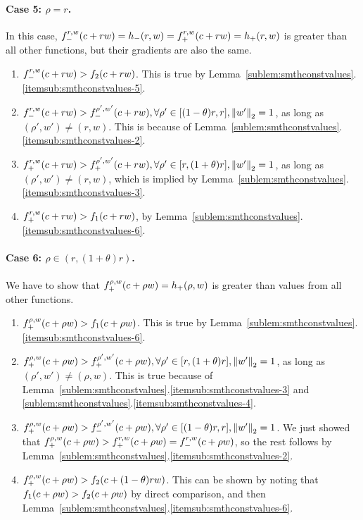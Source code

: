 \paragraph{Case 5: $\rho = r$.}
In this case, $f_-^{{r},{w}}(c+r w) = h_-(r, w) = f_+^{{r},{w}}(c+r w) = h_+(r, w)$ is greater than all other functions, but their gradients are also the same.
\begin{enumerate}
	\item $f_-^{{r},{w}}(c+r w) > f_{2}(c+r w)$.
	This is true by Lemma~\ref{sublem:smthconstvalues}.\ref{itemsub:smthconstvalues-5}.
	\item $f_-^{{r},{w}}(c+r w) > f_-^{{\rho'},{w'}}(c+r w),
	\forall \rho' \in [(1-\theta)r,r], \left\|{w'}\right\|_2 = 1$, as long as $(\rho', w') \neq (r, w)$.
	This is because of Lemma~\ref{sublem:smthconstvalues}.\ref{itemsub:smthconstvalues-2}. 
	\item $f_+^{{r},{w}}(c+r w) > f_+^{{\rho'},{w'}}(c+r w), 
	\forall \rho' \in [r,(1+\theta)r], \left\|{w'}\right\|_2 = 1$, as long as $(\rho', w') \neq (r, w)$,
	which is implied by Lemma~\ref{sublem:smthconstvalues}.\ref{itemsub:smthconstvalues-3}.
	\item $f_+^{{r},{w}}(c+r w) > f_{1}(c+r w)$, by Lemma~\ref{sublem:smthconstvalues}.\ref{itemsub:smthconstvalues-6}.
\end{enumerate}

\paragraph{Case 6: $\rho \in (r, (1+\theta)r)$.}
We have to show that $f_+^{{\rho},{w}}(c+\rho w) = h_+(\rho, w)$ is greater than values from all other functions.
\begin{enumerate}
	\item $f_+^{{\rho},{w}}(c+\rho w) > f_{1}(c+\rho w)$.
	This is true by Lemma~\ref{sublem:smthconstvalues}.\ref{itemsub:smthconstvalues-6}.
	\item $f_+^{{\rho},{w}}(c+\rho w) > f_+^{{\rho'},{w'}}(c+\rho w),
	\forall \rho' \in [r,(1+\theta)r], \left\|{w'}\right\|_2 = 1$, as long as $(\rho', w') \neq (\rho, w)$.
	This is true because of Lemma~\ref{sublem:smthconstvalues}.\ref{itemsub:smthconstvalues-3} and \ref{sublem:smthconstvalues}.\ref{itemsub:smthconstvalues-4}. 
	\item $f_+^{{\rho},{w}}(c+\rho w) > f_-^{{\rho'},{w'}}(c+\rho w), \forall \rho' \in [(1-\theta)r,r], \left\|{w'}\right\|_2 = 1$.
	We just showed that 
	$f_+^{{\rho},{w}}(c+\rho w) > f_+^{{r},{w}}(c+\rho w) = f_-^{{r},{w}}(c+\rho w)$,
	so the rest follows by Lemma~\ref{sublem:smthconstvalues}.\ref{itemsub:smthconstvalues-2}.
	\item $f_+^{{\rho},{w}}(c+\rho w) > f_{2}(c+(1-\theta)r w)$. This can be shown by noting that 
	$f_{1}(c+\rho w) > f_{2}(c+\rho w)$ by direct comparison, and then Lemma~\ref{sublem:smthconstvalues}.\ref{itemsub:smthconstvalues-6}.
\end{enumerate}

